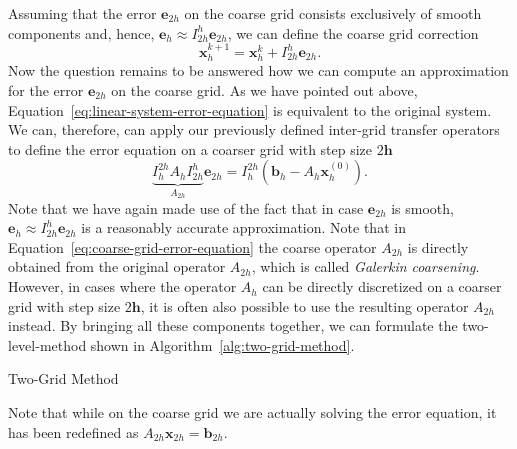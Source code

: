 Assuming that the error $\bm{e}_{2h}$ on the coarse grid consists exclusively of smooth components and, hence, $\bm{e}_{h} \approx I_{2h}^{h} \bm{e}_{2h}$, we can define the coarse grid correction 
\begin{equation}
	\bm{x}^{k+1}_h = \bm{x}^{k}_h + I_{2h}^h \bm{e}_{2h}.
\end{equation} 
Now the question remains to be answered how we can compute an approximation for the error $\bm{e}_{2h}$ on the coarse grid.
As we have pointed out above, Equation~\eqref{eq:linear-system-error-equation} is equivalent to the original system.
We can, therefore, can apply our previously defined inter-grid transfer operators to define the error equation on a coarser grid with step size $2\bm{h}$
\begin{equation}
	\underbrace{I_{h}^{2h} A_h I_{2h}^h}_{A_{2h}} \bm{e}_{2h} = I_{h}^{2h} \left(\bm{b}_h - A_h \bm{x}^{(0)}_h\right).
	\label{eq:coarse-grid-error-equation}
\end{equation}
Note that we have again made use of the fact that in case $\bm{e}_{2h}$ is smooth, $\bm{e}_{h} \approx I_{2h}^{h} \bm{e}_{2h}$ is a reasonably accurate approximation.
Note that in Equation~\eqref{eq:coarse-grid-error-equation} the coarse operator $A_{2h}$ is directly obtained from the original operator $A_{2h}$, which is called \emph{Galerkin coarsening}.
However, in cases where the operator $A_h$ can be directly discretized on a coarser grid with step size $2\bm{h}$, it is often also possible to use the resulting operator $A_{2h}$ instead.
By bringing all these components together, we can formulate the two-level-method shown in Algorithm~\ref{alg:two-grid-method}.
\begin{algorithm}
	\caption{Two-Grid Method}
	\label{alg:two-grid-method}
	\begin{algorithmic}
	\end{algorithmic}
\end{algorithm}
Note that while on the coarse grid we are actually solving the error equation, it has been redefined as $A_{2h} \bm{x}_{2h} = \bm{b}_{2h}$.
